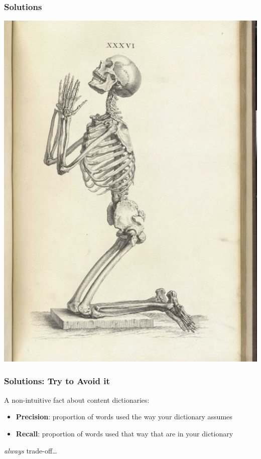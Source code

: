 \documentclass[11pt,compress,professionalfonts]{beamer}
\newcommand{\ita}{\begin{itemize}}
\newcommand{\itm}{\item[]}
\newcommand{\itz}{\end{itemize}}
\begin{document}
\begin{frame}[t]\frametitle{Solutions}

\newpage

\centerline{\includegraphics[scale=.7]{pictures/praying-skeleton}}

\end{frame}
\begin{frame}[t]\frametitle{Solutions: Try to Avoid it}

A non-intuitive fact about content dictionaries:
\ita
\itm \textbf{Precision}: proportion of words used the way your dictionary assumes
\itm \textbf{Recall}: proportion of words used that way that are in your dictionary
\itz
\textit{always} trade-off\ldots

\end{frame}
\end{document}
